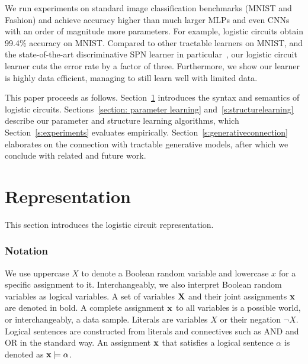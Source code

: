 \documentclass[letterpaper]{article} %
\begin{document}
We run experiments on standard image classification benchmarks (MNIST and Fashion) and achieve accuracy higher than much larger MLPs and even CNNs with an order of magnitude more parameters. For example, logistic circuits obtain 99.4\% accuracy on MNIST.
Compared to other tractable learners on MNIST, and the state-of-the-art discriminative SPN learner in particular~\cite{rat-spn2018}, our logistic circuit learner cuts the error rate by a factor of three.
Furthermore, we show our learner is highly data efficient, managing to still learn well with limited data.

This paper proceeds as follows.
Section~\ref{s:representation} introduces the syntax and semantics of logistic circuits.
Sections~\ref{section: parameter learning} and~\ref{s:structurelearning} describe our parameter and structure learning algorithms, which Section~\ref{s:experiments} evaluates empirically.
Section~\ref{s:generativeconnection} elaborates on the connection with tractable generative models, after which we conclude with related and future work.


\section{Representation} \label{s:representation}
This section introduces the logistic circuit representation.

\subsubsection*{Notation}
We use uppercase $X$ to denote a Boolean random variable and lowercase $x$ for a specific assignment to it. Interchangeably, we also interpret Boolean random variables as logical variables. A set of variables $\bf X$ and their joint assignments $\bf x$ are denoted in bold. A complete assignment $\bf x$ to all variables is a possible world, or interchangeably, a data sample. Literals are variables $X$ or their negation $\neg X$. Logical sentences are constructed from literals and connectives such as AND and OR in the standard way. An assignment $\bf x$ that satisfies a logical sentence $\alpha$ is denoted as ${\bf x} \models \alpha$.
\end{document}
